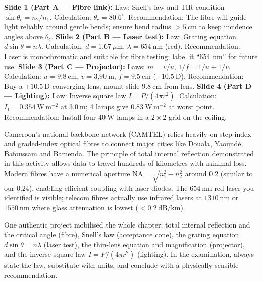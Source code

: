 \documentclass[11pt]{article}
\begin{document}
\begin{exoresolu}
\textbf{Slide 1 (Part A — Fibre link):} Law: Snell's law and TIR condition $\sin\theta_c = n_2/n_1$. Calculation: $\theta_c = 80.6^\circ$. Recommendation: The fibre will guide light reliably around gentle bends; ensure bend radius $> 5\ \mathrm{cm}$ to keep incidence angles above $\theta_c$.
\textbf{Slide 2 (Part B — Laser test):} Law: Grating equation $d\sin\theta = n\lambda$. Calculation: $d=1.67\ \mu\mathrm{m}$, $\lambda=654\ \mathrm{nm}$ (red). Recommendation: Laser is monochromatic and suitable for fibre testing; label it ``654 nm'' for future use.
\textbf{Slide 3 (Part C — Projector):} Laws: $m=v/u$, $1/f=1/u+1/v$. Calculation: $u=9.8\ \mathrm{cm}$, $v=3.90\ \mathrm{m}$, $f=9.5\ \mathrm{cm}$ ($+10.5\ \mathrm{D}$). Recommendation: Buy a $+10.5\ \mathrm{D}$ converging lens; mount slide $9.8\ \mathrm{cm}$ from lens.
\textbf{Slide 4 (Part D — Lighting):} Law: Inverse square law $I=P/(4\pi r^2)$. Calculation: $I_1=0.354\ \mathrm{W\,m^{-2}}$ at $3.0\ \mathrm{m}$; 4 lamps give $0.83\ \mathrm{W\,m^{-2}}$ at worst point. Recommendation: Install four $40\ \mathrm{W}$ lamps in a $2\times 2$ grid on the ceiling.
\end{exoresolu}

\begin{savaistu}
Cameroon's national backbone network (CAMTEL) relies heavily on step-index and graded-index optical fibres to connect major cities like Douala, Yaoundé, Bafoussam and Bamenda. The principle of total internal reflection demonstrated in this activity allows data to travel hundreds of kilometres with minimal loss. Modern fibres have a numerical aperture $\mathrm{NA} = \sqrt{n_1^2-n_2^2}$ around $0.2$ (similar to our $0.24$), enabling efficient coupling with laser diodes. The $654\ \mathrm{nm}$ red laser you identified is visible; telecom fibres actually use infrared lasers at $1310\ \mathrm{nm}$ or $1550\ \mathrm{nm}$ where glass attenuation is lowest ($<0.2\ \mathrm{dB/km}$).
\end{savaistu}

\begin{aretenir}
One authentic project mobilised the whole chapter: total internal reflection and the critical angle (fibre), Snell's law (acceptance cone), the grating equation $d\sin\theta = n\lambda$ (laser test), the thin-lens equation and magnification (projector), and the inverse square law $I = P/(4\pi r^2)$ (lighting). In the examination, always state the law, substitute with units, and conclude with a physically sensible recommendation.
\end{aretenir}
\end{document}
